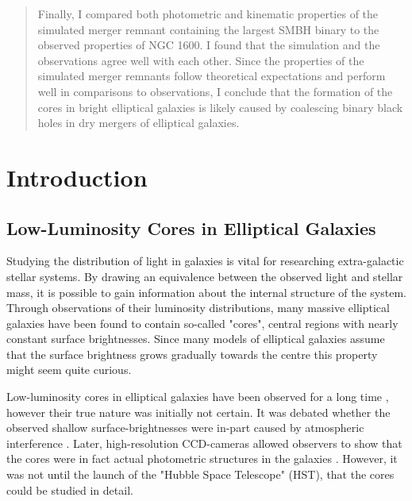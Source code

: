 \documentclass[english, twoside]{HYgradu}
\begin{document}
\begin{abstract}
Finally, I compared both photometric and kinematic properties of the simulated merger remnant containing the largest SMBH binary to the observed properties of NGC 1600. I found that the simulation and the observations agree well with each other. Since the properties of the simulated merger remnants follow theoretical expectations and perform well in comparisons to observations, I conclude that the formation of the cores in bright elliptical galaxies is likely caused by coalescing binary black holes in dry mergers of elliptical galaxies.


\end{abstract}

\mytableofcontents



\chapter{Introduction}

\section{Low-Luminosity Cores in Elliptical Galaxies}

Studying the distribution of light in galaxies is vital for researching extra-galactic stellar systems. By drawing an equivalence between the observed light and stellar mass, it is possible to gain information about the internal structure of the system. Through observations of their luminosity distributions, many massive elliptical galaxies have been found to contain so-called "cores", central regions with nearly constant surface brightnesses. Since many models of elliptical galaxies assume that the surface brightness grows gradually towards the centre \citep[e.g.][]{deVaucouleurs1948, Sersic1968} this property might seem quite curious.

Low-luminosity cores in elliptical galaxies have been observed for a long time \citep[e.g.][]{King1966}, however their true nature was initially not certain. It was debated whether the observed shallow surface-brightnesses were in-part caused by atmospheric interference \citep{King1978, Schweizer1979}. Later, high-resolution CCD-cameras allowed observers to show that the cores were in fact actual photometric structures in the galaxies \citep{Lauer1985, Kormendy1985}. However, it was not until the launch of the "Hubble Space Telescope" (HST), that the cores could be studied in detail.
\end{document}
